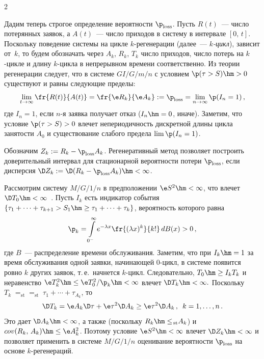 \begin{multicols}{2}
 \pagebreak

Дадим теперь строгое определение веро\-ят\-ности $\p_{\mathrm{loss}}$.
 Пусть $R(t)$~--- число потерянных заявок, а $A(t)$~--- число приходов в систему в
интервале $[0,\,t]$.  Поскольку поведение системы на цикле $k$-ре\-ге\-не\-ра\-ции (далее~--- 
{\it $k$-цикл}), зависит от~$k$, то  будем  обозначать  через $A_k$, $R_k$, $T_k$ число
приходов, число потерь на $k$-цик\-ле и  длину $k$-цик\-ла в непрерывном времени соответственно.
  Из теории регенерации следует, что в системе $GI/G/m/n$ с условием
$\p(\tau>S)\hm>0$  существуют и равны следующие   пределы:
\begin{equation}
 \lim\limits_{t \to \infty}\fr{R(t)}{A(t)}= \fr{\e R_k}{\e
A_k}:=\p_{\mathrm{loss}}=\lim\limits_{n\to\infty}\p(I_n=1)\,,
\label{e4b-mn}
\end{equation}
где $I_n=1$, если $n$-я  заявка получает отказ ($I_n\hm=0$, иначе).
Заметим, что условие $\p(\tau>S)>0$  влечет непериодичность
дискретной длины цикла занятости $A_0$ и существование слабого предела $\lim \p(I_n=1)$.


Обозначим $ Z_k:= R_k-\p_{\mathrm{loss}}A_k$.
      Регенеративный метод позволяет построить  доверительный интервал для
 стационарной   вероятности потери    $\p_{\mathrm{loss}}$,
если дисперсия $\D Z_k:=\D (R_k-\p_{\mathrm{loss}}A_k)\hm<\infty$.

Рассмотрим систему $M/G/1/n$ в предположении $\e S^2\hm<\infty$, что
влечет   $\D T_0\hm<\infty$~\cite{Wolff}. Пусть $I_k$ есть индикатор
события $\{\tau_1+\cdots+\tau_{k+1}>S_1\hm\ge \tau_1+\cdots+\tau_k\}$,
вероятность которого равна 
$$ 
\p_k =\int\limits_{0^-}^\infty e^{-\lambda x}\fr{(\lambda x)^k}{k!} \,dB(x)>0\,, 
$$ 
где $B$~--- распределение времени обслуживания. Заметим, что при $I_k\hm=1$  за время
обслуживания одной заявки, начинающей 0-цикл, в системе появится
ровно $k$  других заявок, т.\,е.\ начнется $k$-цикл. Следовательно,  
$T_0\hm\ge I_k T_k$ и  неравенство $ \e T_k^2\hm\le \e T_0^2/\p_k\hm<\infty $
влечет $\D T_k\hm<\infty.$ Поскольку
$T_k\;{=}_{\!\mathrm{st}}$\linebreak ${=}_{\!\mathrm{st}}\;\tau_1+\cdots+\tau_{A_k}$, то 
\begin{equation*} 
\D T_k=\e A_k \D \tau + \e \tau^2\D A_k \ge \e \tau^2\D
A_k\,,\enskip k=1,\ldots,n\,. 
\end{equation*} 
Это дает  $\D A_k\hm<\infty$, а
также (поскольку $R_k\hm\le{\!_{\mathrm{st}}} A_k$) и $cov(R_k,\,A_k)\hm\le \e A_k^2$.
Поэтому условие $\e S^2\hm<\infty$ влечет $\D Z_k\hm<\infty$ и позволяет
применить в сис\-те\-ме $M/G/1/n$ оценивание вероятности $\p_{\mathrm{loss}}$ на
основе $k$-ре\-ге\-не\-раций.


\end{multicols}
